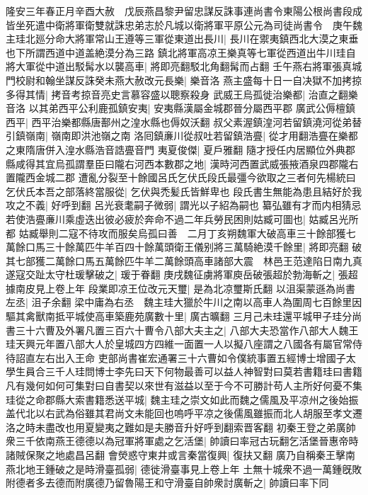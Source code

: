 隆安三年春正月辛酉大赦　戊辰燕昌黎尹留忠謀反誅事連尚書令東陽公根尚書段成皆坐死遣中衛將軍衛雙就誅忠弟志於凡城以衛將軍平原公元為司徒尚書令　庚午魏主珪北廵分命大將軍常山王遵等三軍從東道出長川|{
	長川在禦夷鎮西北大漠之東垂也下所謂西道中道盖絶漠分為三路}
鎮北將軍高凉王樂真等七軍從西道出牛川珪自將大軍從中道出駁髯水以襲高車|{
	將即亮翻駁北角翻髯而占翻}
壬午燕右將軍張真城門校尉和翰坐謀反誅癸未燕大赦改元長樂|{
	樂音洛}
燕主盛每十日一自决獄不加拷掠多得其情|{
	拷音考掠音亮史言慕容盛以聰察殺身}
武威王烏孤徙治樂都|{
	治直之翻樂音洛}
以其弟西平公利鹿孤鎮安夷|{
	安夷縣漢屬金城郡晉分屬西平郡}
廣武公傉檀鎮西平|{
	西平治樂都縣唐鄯州之湟水縣也傉奴沃翻}
叔父素渥鎮湟河若留鎮澆河從弟替引鎮嶺南|{
	嶺南即洪池嶺之南}
洛囘鎮亷川從叔吐若留鎮浩亹|{
	從才用翻浩亹在樂都之東隋唐併入湟水縣浩音誥亹音門}
夷夏俊傑|{
	夏戶雅翻}
隨才授任内居顯位外典郡縣咸得其宜烏孤謂羣臣曰隴右河西本數郡之地|{
	漢時河西置武威張掖酒泉四郡隴右置隴西金城二郡}
遭亂分裂至十餘國呂氏乞伏氏段氏最彊今欲取之三者何先楊統曰乞伏氏本吾之部落終當服從|{
	乞伏與禿髪氏皆鮮卑也}
段氏書生無能為患且結好於我攻之不義|{
	好呼到翻}
呂光衰耄嗣子微弱|{
	謂光以子紹為嗣也}
纂弘雖有才而内相猜忌若使浩亹亷川乘虛迭出彼必疲於奔命不過二年兵勞民困則姑臧可圖也|{
	姑臧呂光所都}
姑臧舉則二寇不待攻而服矣烏孤曰善　二月丁亥朔魏軍大破高車三十餘部獲七萬餘口馬三十餘萬匹牛羊百四十餘萬頭衛王儀别將三萬騎絶漠千餘里|{
	將即亮翻}
破其七部獲二萬餘口馬五萬餘匹牛羊二萬餘頭高車諸部大震　林邑王范達陷日南九真遂寇交趾太守杜瑗擊破之|{
	瑗于眷翻}
庚戌魏征虜將軍庾岳破張超於勃海斬之|{
	張超據南皮見上卷上年}
段業即凉王位改元天璽|{
	是為北凉璽斯氏翻}
以沮渠蒙遜為尚書左丞|{
	沮子余翻}
梁中庸為右丞　魏主珪大獵於牛川之南以高車人為圍周七百餘里因驅其禽獸南抵平城使高車築鹿苑廣數十里|{
	廣古曠翻}
三月己未珪還平城甲子珪分尚書三十六曹及外署凡置三百六十曹令八部大夫主之|{
	八部大夫恐當作八部大人魏王珪天興元年置八部大人於皇城四方四維一面置一人以擬八座謂之八國各有屬官常侍待詔直左右出入王命}
吏部尚書崔宏通署三十六曹如令僕統事置五經博士增國子太學生員合三千人珪問博士李先曰天下何物最善可以益人神智對曰莫若書籍珪曰書籍凡有幾何如何可集對曰自書契以來世有滋益以至于今不可勝計苟人主所好何憂不集珪從之命郡縣大索書籍悉送平城|{
	魏主珪之崇文如此而魏之儒風及平凉州之後始振盖代北以右武為俗雖其君尚文未能回也嗚呼平凉之後儒風雖振而北人胡服至孝文遷洛之時未盡改也用夏變夷之難如是夫勝音升好呼到翻索晋客翻}
初秦王登之弟廣帥衆三千依南燕王德德以為冠軍將軍處之乞活堡|{
	帥讀曰率冠古玩翻乞活堡晉惠帝時諸賊保聚之地處昌呂翻}
會熒惑守東井或言秦當復興|{
	復扶又翻}
廣乃自稱秦王擊南燕北地王鍾破之是時滑臺孤弱|{
	德徙滑臺事見上卷上年}
土無十城衆不過一萬鍾旣敗附德者多去德而附廣德乃留魯陽王和守滑臺自帥衆討廣斬之|{
	帥讀曰率下同}
